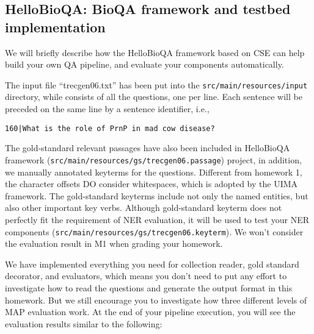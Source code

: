 \subsection{HelloBioQA: BioQA framework and testbed implementation}

We will briefly describe how the HelloBioQA framework based on CSE can help
build your own QA pipeline, and evaluate your components automatically.

The input file ``trecgen06.txt'' has been put into the
\texttt{src/main/resources/input} directory, while consists of all the
questions, one per line. Each sentence will be preceded on the same line by a
sentence identifier, i.e.,

\begin{verbatim}
160|What is the role of PrnP in mad cow disease?
\end{verbatim}

The gold-standard relevant passages have also been included in HelloBioQA
framework (\texttt{src/main/resources/gs/trecgen06.passage}) project, in
addition, we manually annotated keyterms for the questions. Different from
homework 1, the character offsets DO consider whitespaces, which is adopted by
the UIMA framework. The gold-standard keyterms include not only the named
entities, but also other important key verbs. Although gold-standard keyterm
does not perfectly fit the requirement of NER evaluation, it will be used to
test your NER components (\texttt{src/main/resources/gs/trecgen06.keyterm}). We
won't consider the evaluation result in M1 when grading your homework.

We have implemented everything you need for collection reader, gold standard
decorator, and evaluators, which means you don't need to put any effort to
investigate how to read the questions and generate the output format in this
homework. But we still encourage you to investigate how three different levels
of MAP evaluation work. At the end of your pipeline execution, you will see the
evaluation results similar to the following:

